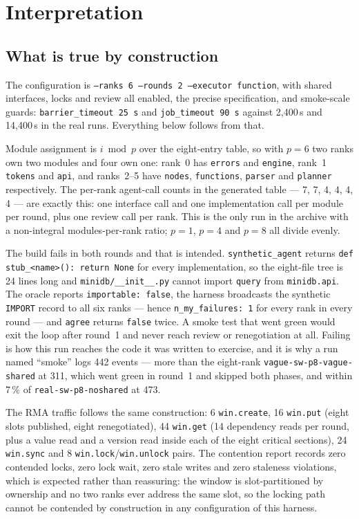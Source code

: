 \documentclass[11pt]{article}
\begin{document}
\section{Interpretation}

\subsection*{What is true by construction}

The configuration is \texttt{--ranks 6 --rounds 2 --executor function}, with shared interfaces,
locks and review all enabled, the precise specification, and smoke-scale guards:
\texttt{barrier\_timeout 25\,s} and \texttt{job\_timeout 90\,s} against 2{,}400\,s and
14{,}400\,s in the real runs. Everything below follows from that.

Module assignment is $i \bmod p$ over the eight-entry table, so with $p = 6$ two ranks own two
modules and four own one: rank~0 has \texttt{errors} and \texttt{engine}, rank~1
\texttt{tokens} and \texttt{api}, and ranks~2--5 have \texttt{nodes}, \texttt{functions},
\texttt{parser} and \texttt{planner} respectively. The per-rank agent-call counts in the
generated table --- 7, 7, 4, 4, 4, 4 --- are exactly this: one interface call and one
implementation call per module per round, plus one review call per rank. This is the only run
in the archive with a non-integral modules-per-rank ratio; $p = 1$, $p = 4$ and $p = 8$ all
divide evenly.

The build fails in both rounds and that is intended. \texttt{synthetic\_agent} returns
\texttt{def stub\_<name>(): return None} for every implementation, so the eight-file tree is 24
lines long and \texttt{minidb/\_\_init\_\_.py} cannot import \texttt{query} from
\texttt{minidb.api}. The oracle reports \texttt{importable: false}, the harness broadcasts the
synthetic \texttt{IMPORT} record to all six ranks --- hence \texttt{n\_my\_failures: 1} for
every rank in every round --- and \texttt{agree} returns \texttt{false} twice. A smoke test
that went green would exit the loop after round~1 and never reach review or renegotiation at
all. Failing is how this run reaches the code it was written to exercise, and it is why a run
named ``smoke'' logs 442 events --- more than the eight-rank
\texttt{vague-sw-p8-vague-shared} at 311, which went green in round~1 and skipped both phases,
and within 7\,\% of \texttt{real-sw-p8-noshared} at 473.

The RMA traffic follows the same construction: 6 \texttt{win.create}, 16 \texttt{win.put}
(eight slots published, eight renegotiated), 44 \texttt{win.get} (14 dependency reads per
round, plus a value read and a version read inside each of the eight critical sections), 24
\texttt{win.sync} and 8 \texttt{win.lock}/\texttt{win.unlock} pairs. The contention report
records zero contended locks, zero lock wait, zero stale writes and zero staleness violations,
which is expected rather than reassuring: the window is slot-partitioned by ownership and no
two ranks ever address the same slot, so the locking path cannot be contended by construction
in any configuration of this harness.
\end{document}
